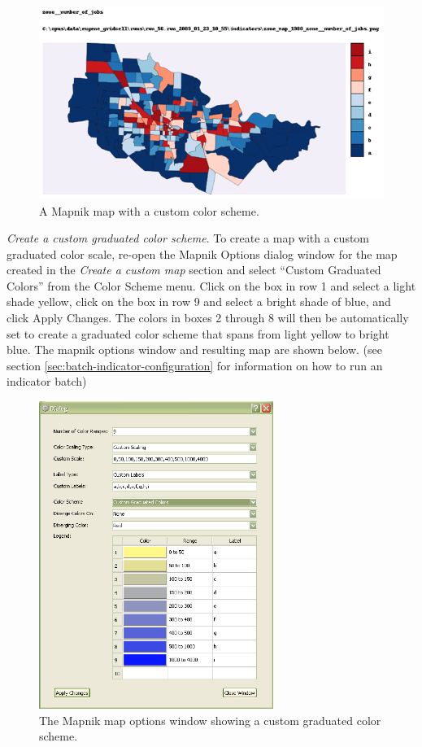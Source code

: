 \begin{figure}[hbp]
\begin{center}
\includegraphics[width=\textwidth]{part-gui/images/sample-map-custom-settings.png}
\end{center}
\caption{A Mapnik map with a custom color scheme.}
\label{fig:sample-map-custom-settings}
\end{figure}
\clearpage

\emph{Create a custom graduated color scheme}. 
To create a map with a custom graduated color scale, 
re-open the Mapnik Options dialog window for the map 
created in the \emph{Create a custom map} section and select 
``Custom Graduated Colors'' from the Color Scheme menu.  Click 
on the box in row 1 and select a light shade yellow, click on 
the box in row 9 and select a bright shade of blue, and click 
Apply Changes. The colors in boxes 2 through 8 will then be automatically set 
to create a graduated color scheme that spans from light 
yellow to bright blue. The mapnik options window and resulting 
map are shown below. (see section \ref{sec:batch-indicator-configuration}
for information on how to run an indicator batch)

\begin{figure}[htp]
\begin{center}
\includegraphics[width=3in]{part-gui/images/result-manager-mapnik-options-example-2.png}
\end{center}
\caption{The Mapnik map options window showing a custom graduated color scheme.}
\label{fig:result-manager-mapnik-options-example-2}
\end{figure}

